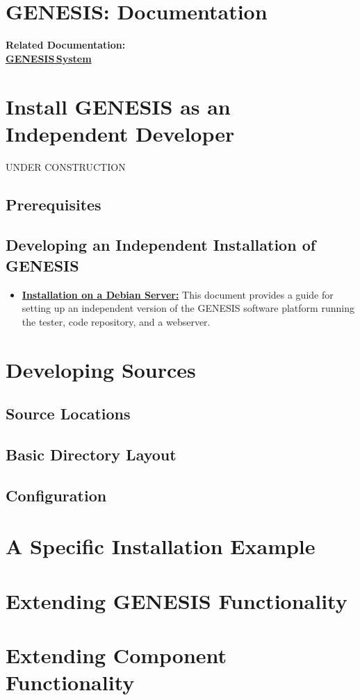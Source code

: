 \documentclass[12pt]{article}
\begin{document}
\section*{GENESIS: Documentation}

{\bf Related Documentation:} \\
\href{../genesis-system/genesis-system.tex}{\bf GENESIS\,System}

\section*{Install GENESIS as an Independent Developer}

UNDER CONSTRUCTION

\subsection*{Prerequisites}

\subsection*{Developing an Independent Installation of GENESIS}

\begin{itemize}
   \item[]\href{../installation-debian-server/installation-debian-server.tex}{\bf Installation on a Debian Server:} This document provides a guide for setting up an independent version of the GENESIS software platform running the tester, code repository, and a webserver.
\end{itemize}

\section*{Developing Sources}

\subsection*{Source Locations}

\subsection*{Basic Directory Layout}

\subsection*{Configuration}

\section*{A Specific Installation Example}

\section*{Extending GENESIS Functionality}

\section*{Extending Component Functionality}
\end{document}
